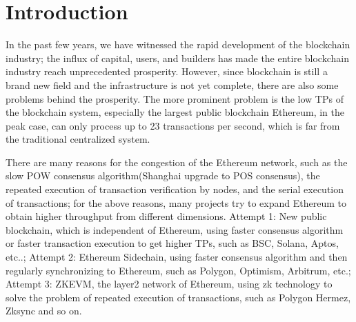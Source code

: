 \section{Introduction}\label{sec:introduction}

In the past few years, we have witnessed the rapid development of the blockchain industry; 
the influx of capital, users, and builders has made the entire blockchain industry reach 
unprecedented prosperity. However, since blockchain is still a brand new field and the
infrastructure is not yet complete, there are also some problems behind the prosperity. 
The more prominent problem is the low TPs of the blockchain system, especially the largest public
blockchain Ethereum\cite{website:Ethereum}, in the peak case\cite{website:Etherscan-chart}, can only process up to 23 
transactions per second, which is far from the traditional centralized system. 

There are many reasons for the congestion of the Ethereum\cite{website:Ethereum} network, such as the slow POW\cite{website:POW} 
consensus algorithm(Shanghai upgrade\cite{website:Shanghai-upgrade} to POS\cite{website:POS} consensus), the repeated execution of 
transaction verification by nodes, and the serial execution of transactions; 
for the above reasons, many projects try to expand Ethereum to obtain higher throughput from different dimensions. Attempt 1: New public blockchain, 
which is independent of Ethereum\cite{website:Ethereum}, 
using faster consensus algorithm or faster transaction execution to get higher TPs, such as BSC\cite{website:BSC}, Solana\cite{website:Solana}, 
Aptos\cite{website:Aptos}, etc..; Attempt 2: Ethereum\cite{website:Ethereum} Sidechain, using faster consensus
algorithm and then regularly synchronizing to Ethereum\cite{website:Ethereum}, such as Polygon\cite{website:Polygon}, Optimism\cite{website:Optimism}, Arbitrum\cite{website:Arbitrum},
etc.; Attempt 3: ZKEVM, the layer2 network of Ethereum\cite{website:Ethereum}, using zk technology to 
solve the problem of repeated execution of transactions, such as Polygon Hermez\cite{website:Polygon-Hermez}, 
Zksync\cite{website:Zksync} and so on.

